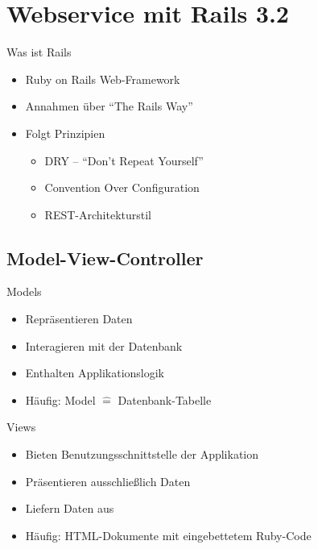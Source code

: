 

\section[Webservice]{Webservice mit Rails 3.2}

\begin{frame}{Was ist Rails}
  \begin{itemize}
    \item Ruby on Rails Web-Framework
    \item Annahmen über \enquote{The Rails Way}
    \item Folgt Prinzipien
    \begin{itemize}
      \item DRY -- \enquote{Don’t Repeat Yourself}
      \item Convention Over Configuration
      \item REST-Architekturstil
    \end{itemize}
  \end{itemize}
\end{frame}

\subsection{Model-View-Controller}

\begin{frame}{Models}
  \begin{itemize}
    \item Repräsentieren Daten
    \item Interagieren mit der Datenbank
    \item Enthalten Applikationslogik
    \item Häufig: Model $\hat =$ Datenbank-Tabelle
  \end{itemize}
\end{frame}

\begin{frame}{Views}
  \begin{itemize}
    \item Bieten Benutzungsschnittstelle der Applikation
    \item Präsentieren ausschließlich Daten
    \item Liefern Daten aus
    \item Häufig: HTML-Dokumente mit eingebettetem Ruby-Code
  \end{itemize}
\end{frame}

